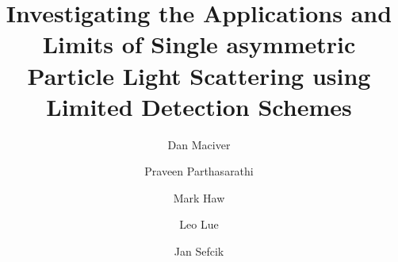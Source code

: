 \documentclass[preprint,3p]{elsarticle}
\begin{document}
\begin{frontmatter}



\title{Investigating the Applications and Limits of Single asymmetric Particle Light Scattering using Limited Detection Schemes}


\author[aff1]{Dan Maciver} %

\author[aff1]{Praveen Parthasarathi}

\author[aff1]{Mark Haw}

\author[aff1]{Leo Lue}

\author[aff1]{Jan Sefcik}




\end{frontmatter}
\end{document}
